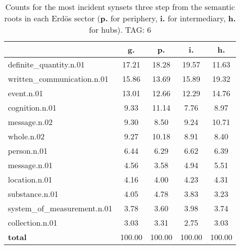 \begin{table}[h!]
\begin{center}
\begin{tabular}{| l | c | c | c | c |}\hline
 & g. & p. & i. & h. \\\hline
definite\_quantity.n.01 & 17.21  & 18.28  & 19.57  & 11.63 \\\hline
written\_communication.n.01 & 15.86  & 13.69  & 15.89  & 19.32 \\\hline
event.n.01 & 13.01  & 12.66  & 12.29  & 14.76 \\\hline
cognition.n.01 & 9.33  & 11.14  & 7.76  & 8.97 \\\hline
message.n.02 & 9.30  & 8.50  & 9.24  & 10.71 \\\hline
whole.n.02 & 9.27  & 10.18  & 8.91  & 8.40 \\\hline
person.n.01 & 6.44  & 6.29  & 6.62  & 6.39 \\\hline
message.n.01 & 4.56  & 3.58  & 4.94  & 5.51 \\\hline
location.n.01 & 4.16  & 4.00  & 4.23  & 4.31 \\\hline
substance.n.01 & 4.05  & 4.78  & 3.83  & 3.23 \\\hline
system\_of\_measurement.n.01 & 3.78  & 3.60  & 3.98  & 3.74 \\\hline
collection.n.01 & 3.03  & 3.31  & 2.75  & 3.03 \\\hline
{{\bf total}} & 100.00  & 100.00  & 100.00  & 100.00 \\\hline
\end{tabular}
\caption{Counts for the most incident synsets three step from the semantic roots in each Erd\"os sector ({\bf p.} for periphery, {\bf i.} for intermediary, {\bf h.} for hubs). TAG: 6}
\end{center}
\end{table}